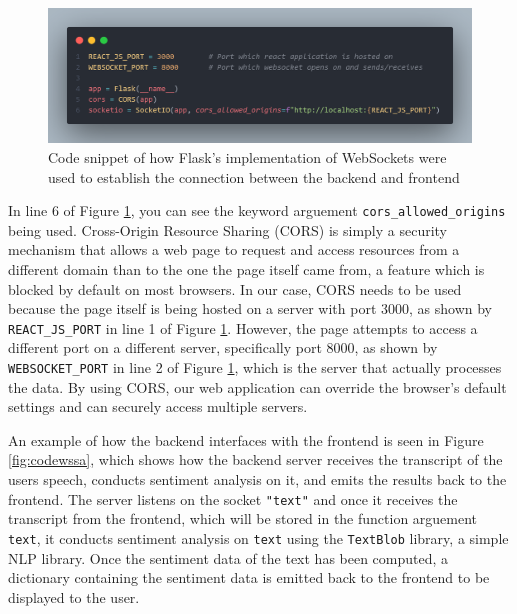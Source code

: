 \documentclass[12pt, a4paper]{article}
\newcommand{\np}
    {
    \vskip 0.4cm
    }
\begin{document}
\begin{figure}[H]
    \centering
    \includegraphics[scale=0.23]{images/codews.png}
    \caption{Code snippet of how Flask's implementation of WebSockets were used to establish the connection between the backend and frontend}
    \label{fig:codews}
\end{figure}

In line 6 of Figure \ref{fig:codews}, you can see the keyword arguement \verb+cors_allowed_origins+ being used. Cross-Origin Resource Sharing (CORS) is simply a security mechanism that allows a web page to request and access resources from a different domain than to the one the page itself came from, a feature which is blocked by default on most browsers. In our case, CORS needs to be used because the page itself is being hosted on a server with port 3000, as shown by \verb+REACT_JS_PORT+ in line 1 of Figure \ref{fig:codews}. However, the page attempts to access a different port on a different server, specifically port 8000, as shown by \verb+WEBSOCKET_PORT+ in line 2 of Figure \ref{fig:codews}, which is the server that actually processes the data. By using CORS, our web application can override the browser's default settings and can securely access multiple servers.
\np
An example of how the backend interfaces with the frontend is seen in Figure \ref{fig:codewssa}, which shows how the backend server receives the transcript of the users speech, conducts sentiment analysis on it, and emits the results back to the frontend. The server listens on the socket \verb+"text"+ and once it receives the transcript from the frontend, which will be stored in the function arguement \verb+text+, it conducts sentiment analysis on \verb+text+ using the \verb+TextBlob+ library, a simple NLP library. Once the sentiment data of the text has been computed, a dictionary containing the sentiment data is emitted back to the frontend to be displayed to the user.
\end{document}
